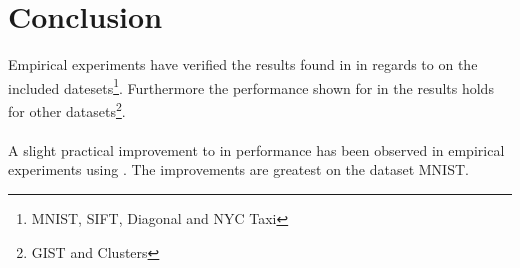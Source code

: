 \section{Conclusion}
\label{conclusion}
Empirical experiments have verified the results found in \cite{wagner17} in regards to \qs{} on the included datesets\footnote{MNIST, SIFT, Diagonal and NYC Taxi}. Furthermore the performance shown for \qs{} in the results holds for other datasets\footnote{GIST and Clusters}.
\\
\\
A slight practical improvement to \qs{} in performance has been observed in empirical experiments using \qsr{}. The improvements are greatest on the dataset MNIST.
